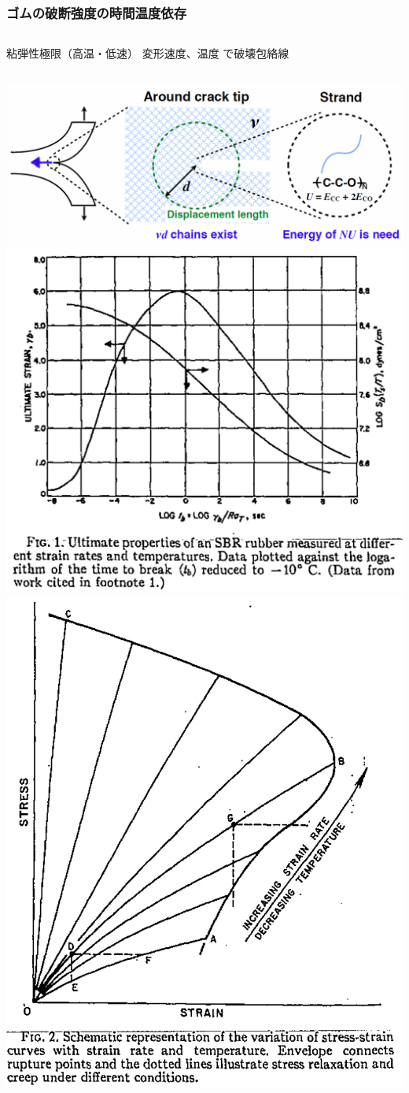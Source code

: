 \documentclass[12pt, dvipdfmx]{beamer}
\begin{document}
\begin{frame}[noframenumbering]
	\frametitle{ゴムの破断強度の時間温度依存}
	\begin{columns}[totalwidth=\textwidth]
			\alert{粘弾性極限}\cite{lake}（高温・低速）
			変形速度、温度\cite{smith} で\alert{破壊包絡線}
	\end{columns}
	\begin{columns}[totalwidth=\textwidth]
			\centering
			\includegraphics[width=.8\textwidth]{Lake_Thomas.png}
			\centering
			\includegraphics[width=.9\textwidth]{Time_Temp_2.png}
			\centering
			\includegraphics[width=.7\textwidth]{Time_Temp_3.png}
	\end{columns}
\end{frame}
\end{document}
